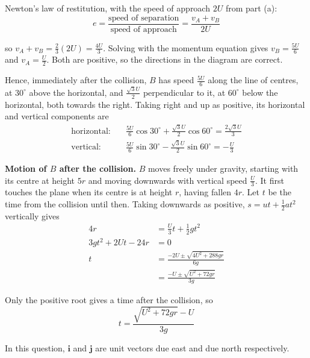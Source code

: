 \documentclass[leqno]{article}
\begin{document}
\begin{enumerate}[
  label=\textbf{\arabic*.},
  leftmargin=*,
  topsep=0pt,
  partopsep=0pt,
  parsep=0pt
]
\begin{djsSolution}
\begin{enumerate}[label=\textbf{(\alph*)}, start=1]
Newton's law of restitution, with the speed of approach \(2U\) from part (a):
\[
e=\frac{\text{speed of separation}}{\text{speed of approach}}=\frac{v_A+v_B}{2U}
\]

so \(v_A+v_B=\frac23(2U)=\frac{4U}{3}\). Solving with the momentum equation gives \(v_B=\frac{5U}{6}\) and \(v_A=\frac{U}{2}\). Both are positive, so the directions in the diagram are correct.

Hence, immediately after the collision, \(B\) has speed \(\frac{5U}{6}\) along the line of centres, at \(30^\circ\) above the horizontal, and \(\frac{\sqrt3U}{2}\) perpendicular to it, at \(60^\circ\) below the horizontal, both towards the right. Taking right and up as positive, its horizontal and vertical components are
\begin{align*}
\text{horizontal:}\quad&\frac{5U}{6}\cos30^\circ+\frac{\sqrt3U}{2}\cos60^\circ=\frac{2\sqrt3U}{3}\\
\text{vertical:}\quad&\frac{5U}{6}\sin30^\circ-\frac{\sqrt3U}{2}\sin60^\circ=-\frac{U}{3}
\end{align*}

\textbf{Motion of \(B\) after the collision.} \(B\) moves freely under gravity, starting with its centre at height \(5r\) and moving downwards with vertical speed \(\frac{U}{3}\). It first touches the plane when its centre is at height \(r\), having fallen \(4r\). Let \(t\) be the time from the collision until then. Taking downwards as positive, \(s=ut+\frac12at^2\) vertically gives
\begin{align*}
4r&=\frac{U}{3}t+\frac12gt^2\\
3gt^2+2Ut-24r&=0\\
t&=\frac{-2U\pm\sqrt{4U^2+288gr}}{6g}\\
&=\frac{-U\pm\sqrt{U^2+72gr}}{3g}
\end{align*}

Only the positive root gives a time after the collision, so
\[
t=\frac{\sqrt{U^2+72gr}-U}{3g}
\]

\end{enumerate}
\end{djsSolution}

\newpage

\questionitem

In this question, $\mathbf{i}$ and $\mathbf{j}$ are unit vectors due east and due north respectively. \\


\end{enumerate}
\end{document}
